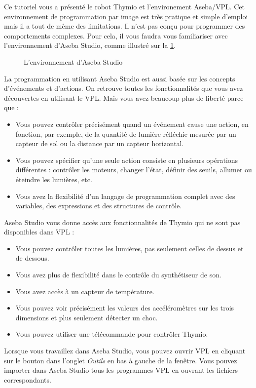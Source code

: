 \label{c.next}

Ce tutoriel vous a présenté le robot Thymio et l'environement Aseba/VPL.
Cet environnement de programmation par image est très pratique et simple d'emploi mais il a tout de même des limitations.
Il n'est pas conçu pour programmer des comportements complexes.
Pour cela, il vous faudra vous familiariser avec l'environnement d'Aseba Studio, comme illustré sur la \cref{fig.studio}.

\begin{figure}[hbt]
\begin{center}
\caption{L'environnement d'Aseba Studio}\label{fig.studio}
\end{center}
\end{figure}

La programmation en utilisant Aseba Studio est aussi basée sur les concepts d'événements et d'actions.
On retrouve toutes les fonctionnalités que vous avez découvertes en utilisant le VPL.
Mais vous avez beaucoup plus de liberté parce que :
\begin{itemize}
\item Vous pouvez contrôler précisément quand un événement cause une action, en fonction, par exemple, de la quantité de lumière réfléchie mesurée par un capteur de sol ou la distance par un capteur horizontal.
\item Vous pouvez spécifier qu'une seule action consiste en plusieurs opérations différentes : contrôler les moteurs, changer l'état, définir des seuils, allumer ou éteindre les lumières, etc.
\item Vous avez la flexibilité d'un langage de programmation complet avec des variables, des expressions et des structures de contrôle.
\end{itemize}

Aseba Studio vous donne accès aux fonctionnalités de Thymio qui ne sont pas disponibles dans VPL :
\begin{itemize}
\item Vous pouvez contrôler toutes les lumières, pas seulement celles de dessus et de dessous.
\item Vous avez plus de flexibilité dans le contrôle du synthétiseur de son.
\item Vous avez accès à un capteur de température.
\item Vous pouvez voir précisément les valeurs des accéléromètres sur les trois dimensions et plus seulement détecter un choc.
\item Vous pouvez utiliser une télécommande pour contrôler Thymio.
\end{itemize}
Lorsque vous travaillez dans Aseba Studio, vous pouvez ouvrir VPL en cliquant sur le bouton  dans l'onglet \emph{Outils} en bas à gauche de la fenêtre.
Vous pouvez importer dans Aseba Studio tous les programmes VPL en ouvrant les fichiers correspondants.

